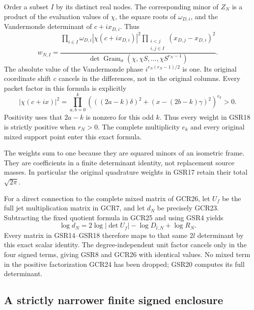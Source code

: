 \documentclass[11pt,a4paper]{article}
\begin{document}
Order a subset $I$ by its distinct real nodes. The corresponding
minor of $Z_N$ is a product of the evaluation values of $\chi$,
the square roots of $\omega_{D,i}$, and the Vandermonde
determinant of $c+ix_{D,i}$. Thus
\[
 w_{N,I}=
 \frac{\displaystyle
   \prod_{i\in I}\omega_{D,i}|\chi(c+ix_{D,i})|^2
   \prod_{\substack{i<j\\i,j\in I}}(x_{D,j}-x_{D,i})^2}
 {\displaystyle
   \det\operatorname{Gram}_\sigma
               (\chi,\chi S,\ldots,\chi S^{r_N-1})}.
\tag{GSR18}
\]
The absolute value of the Vandermonde phase
$i^{r_N(r_N-1)/2}$ is one. Its original coordinate shift $c$
cancels in the differences, not in the original columns.
Every packet factor in this formula is explicitly
\[
 |\chi(c+ix)|^2
  =\prod_{a,b=0}^k
     \left(((2a-k)\delta)^2+
                    (x-(2b-k)\gamma)^2\right)^{e_k}>0.
\tag{GSR19}
\]
Positivity uses that $2a-k$ is nonzero for this odd $k$.
Thus every weight in GSR18 is strictly positive when $r_N>0$.
The complete multiplicity $e_k$ and every original mixed support
point enter this exact formula.

The weights sum to one because they are squared minors of
an isometric frame. They are coefficients in a finite
determinant identity, not replacement source masses. In
particular the original quadrature weights in GSR17 retain
their total $\sqrt{2\pi}$.

For a direct connection to the complete mixed matrix of GCR26,
let $U_f$ be the full jet multiplication matrix in GCR7,
and let $d_N$ be precisely GCR23. Subtracting the fixed
quotient formula in GCR25 and using GSR4 yields
\[
 \log d_N
     =2\log|\det U_f|-\log D_{l,N}+\log R_N.
\tag{GSR20}
\]
Every matrix in GSR14--GSR18 therefore maps to that same
$2l$ determinant by this exact scalar identity. The
degree-independent unit factor cancels only in the four signed
terms, giving GSR8 and GCR26 with identical values.
No mixed term in the positive factorization GCR24 has been
dropped; GSR20 computes its full determinant.

\subsection{A strictly narrower finite signed enclosure}
\end{document}
